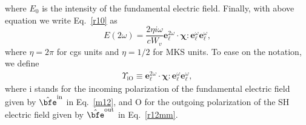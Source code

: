 where $E_0$ is the intensity of the fundamental electric field.
Finally, with above equation we write Eq.~\eqref{r10} as
\begin{equation}\label{mr10}
E(2\omega) 
= \frac{2\eta i \omega}{cW_v}
\mathbf{e}^{2\omega}_{\ell}\cdot\boldsymbol{\chi}:\mathbf{e}^{\omega}_{\ell}
\mathbf{e}^{\omega}_{\ell}
,
\end{equation}
where $\eta=2\pi$ for cgs units and $\eta=1/2$ for MKS units.
To ease on the notation, we define
\begin{align}\label{mc0}
\Upsilon_{\mathrm{iO}}
\equiv 
\mathbf{e}^{2\omega}_{\ell}\cdot\boldsymbol{\chi}:\mathbf{e}^{\omega}_{\ell}
\mathbf{e}^{\omega}_{\ell}
,
\end{align}
where i stands for the incoming polarization of the fundamental
electric field given by $\hat\bfe^{\mathrm{in}}$ in Eq.~\eqref{m12},
and O for the outgoing polarization of the SH electric field
given by $\hat\bfe^{\mathrm{out}}$ in Eq.~\eqref{r12mm}.

